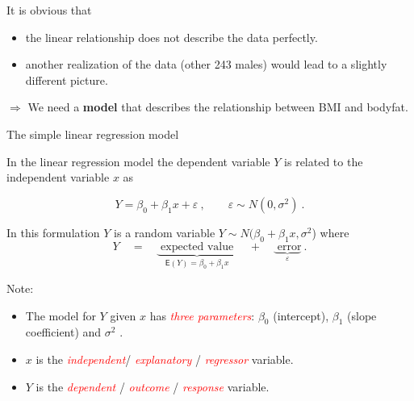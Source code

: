\documentclass[
  10pt,
  ignorenonframetext,
]{beamer}
\providecommand{\tightlist}{%
  \setlength{\itemsep}{0pt}\setlength{\parskip}{0pt}}
\begin{document}
\begin{frame}
It is obvious that

\begin{itemize}
\tightlist
\item
  the linear relationship does not describe the data perfectly.
\item
  another realization of the data (other 243 males) would lead to a
  slightly different picture.
\end{itemize}

\vspace{4mm}

\(\Rightarrow\) We need a \textbf{model} that describes the relationship
between BMI and bodyfat.
\end{frame}

\begin{frame}
\begin{block}{The simple linear regression model}
\protect\hypertarget{the-simple-linear-regression-model}{}
\vspace{3mm}

In the linear regression model the dependent variable \(Y\) is related
to the independent variable \(x\) as

\[Y = \beta_0 + \beta_1 x + \varepsilon \ , \qquad \varepsilon \sim N(0,\sigma^2) \ .\]
\vspace{2mm}

In this formulation \(Y\) is a random variable
\(Y \sim N(\beta_0 + \beta_1 x, \sigma^2\)) where
\[Y \quad= \quad \underbrace{\text{ expected value }}_{\mathsf{E}(Y) = \beta_0 + \beta_1 x} \quad + \quad \underbrace{\text{ error}}_{\varepsilon}  \ .\]

Note:

\begin{itemize}
\tightlist
\item
  The model for \(Y\) given \(x\) has
  \emph{\textcolor{red}{three parameters}}: \(\beta_0\) (intercept),
  \(\beta_1\) (slope coefficient) and \(\sigma^2\) .
\item
  \(x\) is the \emph{\textcolor{red}{independent}}/
  \emph{\textcolor{red}{explanatory}} /
  \emph{\textcolor{red}{regressor}} variable.
\item
  \(Y\) is the \emph{\textcolor{red}{dependent}} /
  \emph{\textcolor{red}{outcome}} / \emph{\textcolor{red}{response}}
  variable.
\end{itemize}
\end{block}
\end{frame}
\end{document}
